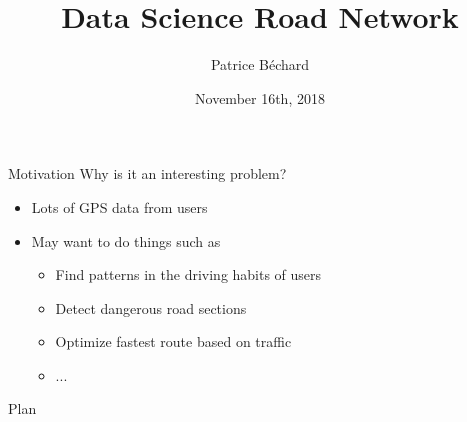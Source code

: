 \documentclass[aspectratio=169]{beamer}
\author{Patrice B\'echard}
\institute[Intact]{
\small{Intact Data Lab} \\
\textit{patrice.bechard@intact.net}
}
\title{Data Science Road Network}
\date{November 16th, 2018}
\begin{document}

\begin{frame}[plain, t]
  \titlepage
\end{frame}


\begin{frame}{Motivation}
\centering
{\Large Why is it an interesting problem?}
\vspace{.5cm}

\begin{itemize}
    \item Lots of GPS data from users
    \item May want to do things such as
    \begin{itemize}
        \item Find patterns in the driving habits of users
        \item Detect dangerous road sections
        \item Optimize fastest route based on traffic
        \item ...
    \end{itemize}
\end{itemize}
    
\end{frame}


\begin{frame}{Plan}
  \tableofcontents
\end{frame}

\end{document}
